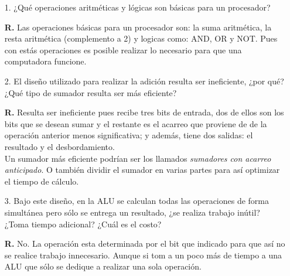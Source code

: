 \documentclass[12pt, letterpaper]{article}
\begin{document}
        \begin{itemize}
          \item[1.] ¿Qué operaciones aritméticas y lógicas  son básicas para un
                    procesador? \vspace{.2cm}

                    \textbf{R.} Las operaciones básicas para un procesador son:
                                la suma aritmética, la resta aritmética
                                (complemento a 2) y logicas como: AND, OR y NOT.
                                Pues con estás operaciones es posible realizar lo
                                necesario para que una computadora funcione.

          \item[2.] El diseño utilizado para realizar la adición resulta ser
                    ineficiente, ¿por qué? ¿Qué tipo de sumador resulta ser más
                    eficiente? \vspace{.2cm}

                    \textbf{R.} Resulta ser ineficiente pues recibe tres bits de
                                entrada, dos de ellos son los bits que se desean
                                sumar y el restante es el acarreo que proviene de
                                de la operación anterior menos significativa; y
                                además, tiene dos salidas: el resultado y el
                                desbordamiento.\\
                                Un sumador más eficiente podrían ser los llamados
                                \textit{sumadores con acarreo anticipado}. O
                                también dividir el sumador en varias partes para
                                así optimizar el tiempo de cálculo.

          \item[3.] Bajo este diseño, en la ALU se calculan todas las operaciones
                    de forma simultánea pero sólo se entrega un resultado, ¿se
                    realiza trabajo inútil? ¿Toma tiempo adicional? ¿Cuál es el
                    costo? \vspace{.2cm}

                    \textbf{R.} No. La operación esta determinada por el bit que
                                indicado para que así no se realice trabajo innecesario.
                                Aunque si tom a un poco más de tiempo a una ALU
                                que sólo se dedique a realizar una sola operación.


\end{itemize}
\end{document}
